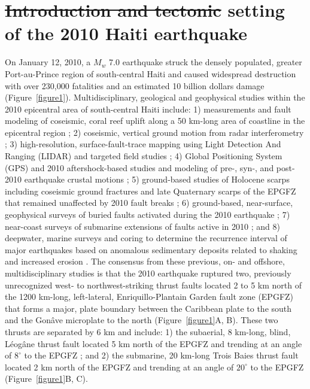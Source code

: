 \documentclass[linenumbers,draft]{agujournal}
\providecommand{\DIFaddtex}[1]{{\protect\color{blue}\uwave{#1}}} %
\providecommand{\DIFdeltex}[1]{{\protect\color{red}\sout{#1}}}                      %
\providecommand{\DIFaddbegin}{} %
\providecommand{\DIFaddend}{} %
\providecommand{\DIFdelbegin}{} %
\providecommand{\DIFdelend}{} %
\providecommand{\DIFadd}[1]{\texorpdfstring{\DIFaddtex{#1}}{#1}} %
\providecommand{\DIFdel}[1]{\texorpdfstring{\DIFdeltex{#1}}{}} %
\begin{document}
\section{\DIFdelbegin \DIFdel{Introduction and tectonic }\DIFdelend \DIFaddbegin \DIFadd{Tectonic }\DIFaddend setting of the 2010 Haiti earthquake}
\label{sec:intro}
On January 12, 2010, a $M_w$ 7.0 earthquake struck the densely populated, greater Port-au-Prince region of south-central Haiti and caused widespread destruction with over 230,000 fatalities and an estimated 10 billion dollars \DIFaddbegin \DIFadd{in }\DIFaddend damage \citep{prentice2010seismic,bilham2010lessons,paultre2013damage,kocel2016near} (Figure~\ref{figure1}). Multidisciplinary, geological and geophysical studies within the 2010 epicentral area of south-central Haiti include: 1) measurements and fault modeling of coseismic, coral reef uplift along a 50 km-long area of coastline in the epicentral region \citep{hayes2010complex}; 2) coseismic, vertical ground motion from radar interferometry \citep{hashimoto2011fan}; 3) high-resolution, surface-fault-trace mapping using Light Detection And Ranging (LIDAR) and targeted field studies \citep{cowgill2012interactive}; 4) Global Positioning System (GPS) and 2010 aftershock-based studies and modeling of pre-, syn-, and post-2010 earthquake crustal motions \citep{calais2010transpressional,nettles2010earthquake,symithe2013coseismic,douilly2013crustal,douilly2015three}; 5) ground-based studies of Holocene scarps including coseismic ground fractures and late Quaternary scarps of the EPGFZ that remained unaffected by 2010 fault breaks \citep{prentice2010seismic,koehler2011field,rathje2014geotechnical,saint2015seismotectonics}; 6) ground-based, near-surface, geophysical surveys of buried faults activated during the 2010 earthquake \citep{kocel2016near}; 7) near-coast surveys of submarine extensions of faults active in 2010 \citep{hornbach2010high,mercier20112010}; and 8) deepwater, marine surveys and coring to determine the recurrence interval of major earthquakes based on anomalous sedimentary deposits related to shaking and increased erosion \citep{mchugh2011offshore}. The consensus from these previous, on- and offshore, multidisciplinary studies is that the 2010 earthquake ruptured two, previously unrecognized west- to northwest-striking thrust faults located 2 to 5 km north of the 1200 km-long, left-lateral, Enriquillo-Plantain Garden fault zone (EPGFZ) that forms a major, plate boundary between the Caribbean plate to the south and the Gon\^ave microplate to the north \citep{mann1995actively,calais2010transpressional,benford2012gps,corbeau2016transpressive} (Figure~\ref{figure1}A, B). These two thrusts are separated by \DIFaddbegin \DIFadd{a distance of }\DIFaddend 6 km and include: 1) the subaerial, 8 km-long, blind, L\'eog\^ane thrust fault located 5 km north of the EPGFZ and trending at an angle of $8^{\circ}$ to the EPGFZ \citep{calais2010transpressional,douilly2013crustal,douilly2015three}; and 2) the submarine, 20 km-long Trois Baies thrust fault located 2 km north of the EPGFZ and trending at an angle of $20^{\circ}$ to the EPGFZ \citep{mercier20112010,symithe2013coseismic} (Figure~\ref{figure1}B, C).
\end{document}
